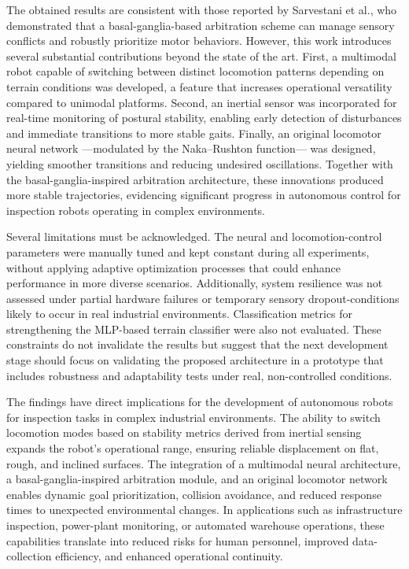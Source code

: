 \documentclass[preprint,12pt]{elsarticle}
\begin{document}
The obtained results are consistent with those reported by Sarvestani et al., who demonstrated that a basal-ganglia-based arbitration scheme can manage sensory conflicts and robustly prioritize motor behaviors. However, this work introduces several substantial contributions beyond the state of the art. First, a multimodal robot capable of switching between distinct locomotion patterns depending on terrain conditions was developed, a feature that increases operational versatility compared to unimodal platforms. Second, an inertial sensor was incorporated for real-time monitoring of postural stability, enabling early detection of disturbances and immediate transitions to more stable gaits. Finally, an original locomotor neural network ---modulated by the Naka–Rushton function--- was designed, yielding smoother transitions and reducing undesired oscillations. Together with the basal-ganglia-inspired arbitration architecture, these innovations produced more stable trajectories, evidencing significant progress in autonomous control for inspection robots operating in complex environments. 

Several limitations must be acknowledged. The neural and locomotion-control parameters were manually tuned and kept constant during all experiments, without applying adaptive optimization processes that could enhance performance in more diverse scenarios. Additionally, system resilience was not assessed under partial hardware failures or temporary sensory dropout-conditions likely to occur in real industrial environments. Classification metrics for strengthening the MLP-based terrain classifier were also not evaluated. These constraints do not invalidate the results but suggest that the next development stage should focus on validating the proposed architecture in a prototype that includes robustness and adaptability tests under real, non-controlled conditions. 

The findings have direct implications for the development of autonomous robots for inspection tasks in complex industrial environments. The ability to switch locomotion modes based on stability metrics derived from inertial sensing expands the robot's operational range, ensuring reliable displacement on flat, rough, and inclined surfaces. The integration of a multimodal neural architecture, a basal-ganglia-inspired arbitration module, and an original locomotor network enables dynamic goal prioritization, collision avoidance, and reduced response times to unexpected environmental changes. In applications such as infrastructure inspection, power-plant monitoring, or automated warehouse operations, these capabilities translate into reduced risks for human personnel, improved data-collection efficiency, and enhanced operational continuity. 
\end{document}
